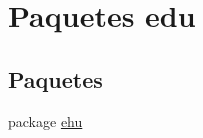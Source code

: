 \hypertarget{namespaceedu}{}\section{Paquetes edu}
\label{namespaceedu}
\subsection*{Paquetes}
\begin{DoxyCompactItemize}
\item 
package \mbox{\hyperlink{namespaceedu_1_1ehu}{ehu}}
\end{DoxyCompactItemize}
